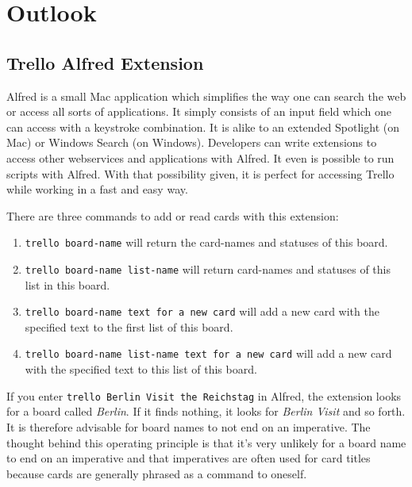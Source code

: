\onehalfspacing
\chapter{Outlook}
  \label{Outlook}

\section{Trello Alfred Extension}

Alfred \cite{alfred} is a small Mac application which simplifies the way one can search the web or access all sorts of applications. It simply consists of an input field which one can access with a keystroke combination. It is alike to an extended Spotlight (on Mac) or Windows Search (on Windows). Developers can write extensions to access other webservices and applications with Alfred. It even is possible to run scripts with Alfred. With that possibility given, it is perfect for accessing Trello while working in a fast and easy way. 



There are three commands to add or read cards with this extension:

\begin{enumerate}
	\item \texttt{trello board-name} will return the card-names and statuses of this board.
	\item \texttt{trello board-name list-name} will return card-names and statuses of this list in this board.
	\item \texttt{trello board-name text for a new card} will add a new card with the specified text to the first list of this board.
	\item \texttt{trello board-name list-name text for a new card} will add a new card with the specified text to this list of this board.
\end{enumerate}

If you enter \texttt{trello Berlin Visit the Reichstag} in Alfred, the extension looks for a board called \emph{Berlin}. If it finds nothing, it looks for \emph{Berlin Visit} and so forth. It is therefore advisable for board names to not end on an imperative. The thought behind this operating principle is that it's very unlikely for a board name to end on an imperative and that imperatives are often used for card titles because cards are generally phrased as a command to oneself.


